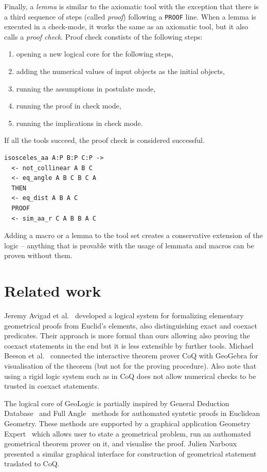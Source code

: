 \documentclass[runningheads]{llncs}
\begin{document}
Finally, a \emph{lemma} is similar to the axiomatic tool with the
exception that there is a third sequence of steps
(called \emph{proof}) following a \texttt{PROOF} line. When a lemma is
executed in a check-mode, it works the same as an axiomatic tool, but
it also calls a \emph{proof check}.
Proof check constists of the following steps:
\begin{enumerate}
\item opening a new logical core for the following steps,
\item adding the numerical values of input objects as the initial objects,
\item running the assumptions in postulate mode,
\item running the proof in check mode,
\item running the implications in check mode.
\end{enumerate}
If all the tools succeed, the proof check is considered successful.

\begin{verbatim}
isosceles_aa A:P B:P C:P -> 
  <- not_collinear A B C
  <- eq_angle A B C B C A
  THEN
  <- eq_dist A B A C
  PROOF
  <- sim_aa_r C A B B A C
\end{verbatim}

Adding a macro or a lemma to the tool set creates a conservative
extension of the logic -- anything that is provable with the usage of
lemmata and macros can be proven without them.

\section{Related work}

Jeremy Avigad et al.~\cite{Coexact} developed a logical system for
formalizing elementary geometrical proofs from Euclid's elements, also
distinguishing exact and coexact predicates. Their approach is more
formal than ours allowing also proving the coexact statements in the
end but it is less extensible by further tools.
Michael Beeson et al.~\cite{GeoCoQ} connected the interactive theorem
prover CoQ with GeoGebra for visualisation of the theorem (but not for
the proving procedure). Also note that using a rigid logic system such
as in CoQ does not allow numerical checks to be trusted in coexact
statements.

The logical core of GeoLogic is partially inspired by General
Deduction Database~\cite{GDD} and Full Angle~\cite{FullAngle} methods for authomated syntetic proofs in
Euclidean Geometry.
These methods are supported by a graphical application
Geometry Expert~\cite{GEX} which allows user to state a
geometrical problem, run an authomated geometrical theorem prover on
it, and visualise the proof.
Julien Narboux presented a similar graphical interface for
construction of geometrical statement traslated to CoQ.
\end{document}

